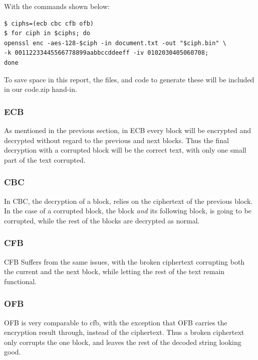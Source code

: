 \documentclass{article}
\begin{document}
With the commands shown below:
\begin{verbatim}
$ ciphs=(ecb cbc cfb ofb)
$ for ciph in $ciphs; do 
openssl enc -aes-128-$ciph -in document.txt -out "$ciph.bin" \ 
-k 00112233445566778899aabbccddeeff -iv 0102030405060708;
done
\end{verbatim}

To save space in this report, the files, and code to generate these 
will be included in our code.zip hand-in. 

\subsubsection{ECB}
As mentioned in the previous section, in ECB every block will be encrypted
and decrypted without regard to the previous and next blocks. Thus the
final decryption with a corrupted block will be the correct text, with only
one small part of the text corrupted.\\

\subsubsection{CBC}
In CBC, the decryption of a block, relies on the ciphertext of the previous
block. In the case of a corrupted block, the block \emph{and} its
following block, is going to be corrupted, while the rest of the blocks
are decrypted as normal.\\

\subsubsection{CFB}
CFB Suffers from the same issues, with the broken ciphertext corrupting
both the current and the next block, while letting the rest of the text
remain functional.

\subsubsection{OFB}
OFB is very comparable to cfb, with the exception that OFB carries the
encryption result through, instead of the ciphertext. Thus a broken
ciphertext only corrupts the one block, and leaves the rest of the decoded
string looking good.
\end{document}
